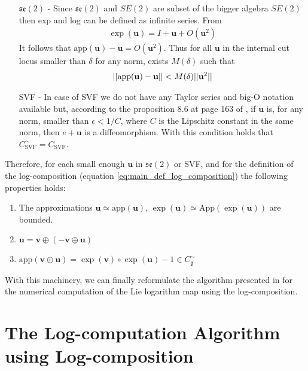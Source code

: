 \begin{enumerate}
	\item[$\mathfrak{se}(2)$ -] Since $\mathfrak{se}(2)$ and $SE(2)$ are subset of the bigger algebra $SE(2)$ then exp and log can be defined as infinite series. From 
	\begin{align*}
	\exp(\mathbf{u}) = I + \mathbf{u} + O(\mathbf{u}^2) 
	\end{align*}
	It follows that $\text{app}(\mathbf{u}) - \mathbf{u} = O(\mathbf{u}^2)$. Thus for all $\mathbf{u}$ in the internal cut locus smaller than $\delta$ for any norm, exists $M(\delta)$ such that
	\begin{align*}
	\vert\lvert \text{app}(\mathbf{u}) - \mathbf{u}  \rvert\vert < M(\delta) \vert\lvert \mathbf{u}^2 \rvert\vert
	\end{align*}
	\item[SVF -] In case of SVF we do not have any Taylor series and big-O notation available but, according to the proposition 8.6 at page 163 of \cite{younes2010shapes}, if $\mathbf{u}$ is, for any norm, smaller than $\epsilon<1/C$, where $C$ is the Lipschitz constant in the same norm, then $e + \mathbf{u}$ is a diffeomorphism. With this condition holds that
	$C_\text{SVF}^{\sim} = C_\text{SVF}$. 
\end{enumerate}

\noindent
Therefore, for each small enough $\mathbf{u}$ in $\mathfrak{se}(2)$ or SVF, 
and for the definition of the log-composition (equation \ref{eq:main_def_log_composition}) 
the following properties holds:
\begin{enumerate}
	\item The approximations $\mathbf{u} \simeq   \text{app} (\mathbf{u})$, $\exp(\mathbf{u}) \simeq   \text{App} (\exp(\mathbf{u})) $ are bounded.
	\item $\mathbf{u} = \mathbf{v} \oplus (-\mathbf{v} \oplus  \mathbf{u} )$
	\item $\text{app} (\mathbf{v} \oplus  \mathbf{u}) = \exp(\mathbf{v})\circ\exp(\mathbf{u}) - 1 \in C_\mathfrak{g} ^{\sim}$
\end{enumerate}

\noindent
With this machinery, we can finally reformulate the algorithm presented in \cite{Bossa:08} for the numerical computation of the Lie logarithm map using the log-composition.

\section{The Log-computation Algorithm using Log-composition}

